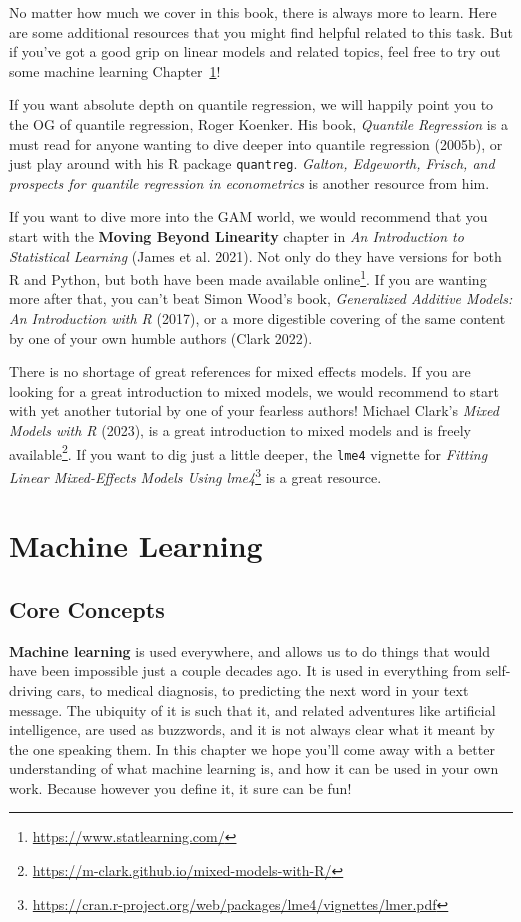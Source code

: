\documentclass[
  letterpaper,
]{krantz}
\DeclareRobustCommand{\href}[2]{#2\footnote{\url{#1}}}
\begin{document}
No matter how much we cover in this book, there is always more to learn.
Here are some additional resources that you might find helpful related
to this task. But if you've got a good grip on linear models and related
topics, feel free to try out some machine learning
Chapter~\ref{sec-ml-core-concepts}!

If you want absolute depth on quantile regression, we will happily point
you to the OG of quantile regression, Roger Koenker. His book,
\emph{Quantile Regression} is a must read for anyone wanting to dive
deeper into quantile regression (2005b), or just play around with his R
package \texttt{quantreg}. \emph{Galton, Edgeworth, Frisch, and
prospects for quantile regression in econometrics} is another resource
from him.

If you want to dive more into the GAM world, we would recommend that you
start with the \textbf{Moving Beyond Linearity} chapter in \emph{An
Introduction to Statistical Learning} (James et al. 2021). Not only do
they have versions for both R and Python, but both have been made
\href{https://www.statlearning.com/}{available online}. If you are
wanting more after that, you can't beat Simon Wood's book,
\emph{Generalized Additive Models: An Introduction with R} (2017), or a
more digestible covering of the same content by one of your own humble
authors (Clark 2022).

There is no shortage of great references for mixed effects models. If
you are looking for a great introduction to mixed models, we would
recommend to start with yet another tutorial by one of your fearless
authors! Michael Clark's \emph{Mixed Models with R} (2023), is a great
introduction to mixed models and is
\href{https://m-clark.github.io/mixed-models-with-R/}{freely available}.
If you want to dig just a little deeper, the \texttt{lme4} vignette for
\href{https://cran.r-project.org/web/packages/lme4/vignettes/lmer.pdf}{\emph{Fitting
Linear Mixed-Effects Models Using lme4}} is a great resource.

\part{Machine Learning}

\chapter{Core Concepts}\label{sec-ml-core-concepts}

\textbf{Machine learning} is used everywhere, and allows us to do things
that would have been impossible just a couple decades ago. It is used in
everything from self-driving cars, to medical diagnosis, to predicting
the next word in your text message. The ubiquity of it is such that it,
and related adventures like artificial intelligence, are used as
buzzwords, and it is not always clear what it meant by the one speaking
them. In this chapter we hope you'll come away with a better
understanding of what machine learning is, and how it can be used in
your own work. Because however you define it, it sure can be fun!
\end{document}
